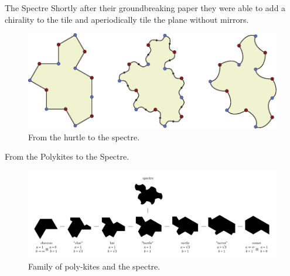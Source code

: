 \documentclass{beamer}
\begin{document}
\begin{frame}{The Spectre}
    Shortly after their groundbreaking paper they were able to add a chirality to the tile and aperiodically tile the plane without mirrors. \cite{Smith_2024_chiral}
    \begin{figure}
        \centering
        \includegraphics[width=\linewidth]{images/aperiodic-pdfs/polygon_to_spectre.pdf}
        \caption{From the hurtle to the spectre. \cite{Smith_2024_chiral}}
        \label{fig:turle-spectra}
    \end{figure}
\end{frame}

\begin{frame}{From the Polykites to the Spectre.}
    \begin{figure}
        \centering
        \includegraphics[width=\textwidth]{images/polykite-family/monotile-continuum.png}
        \caption{Family of poly-kites and the spectre. \cite{steckles2023aperiodicmonotile}}
        \label{fig:poly-kites-spectre}
    \end{figure}
\end{frame}

%     
\end{document}
